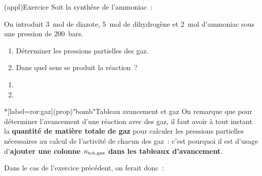 \documentclass[../../main/main.tex]{subfiles}
\begin{document}
\begin{tcb}[width=\linewidth, breakable](appl){Exercice}
	Soit la synthèse de l'ammoniac~:


	On introduit \SI{3}{mol} de diazote, \SI{5}{mol} de dihydrogène et
	\SI{2}{mol} d'ammoniac sous une pression de \SI{200}{bars}.
	\begin{enumerate}
		\item Déterminer les pressions partielles des gaz.
		\item Dans quel sens se produit la réaction~?
	\end{enumerate}
	\tcblower
	\begin{enumerate}
		\item
		      \vspace{-15pt}
		\item
	\end{enumerate}
\end{tcb}

\begin{tcb}*[label=ror:gaz](prop)"bomb"{Tableau avancement et gaz}
	On remarque que pour déterminer l'avancement d'une réaction avec des gaz, il
	faut avoir à tout instant la \textbf{quantité de matière totale de gaz} pour
	calculer les pressions partielles nécessaires au calcul de l'activité de
	chacun des gaz~: c'est pourquoi il est d'usage d'\textbf{ajouter une colonne
		$n_{\rm tot, gaz}$ dans les tableaux d'avancement}.
\end{tcb}

Dans le cas de l'exercice précédent, on ferait donc~:
\end{document}
